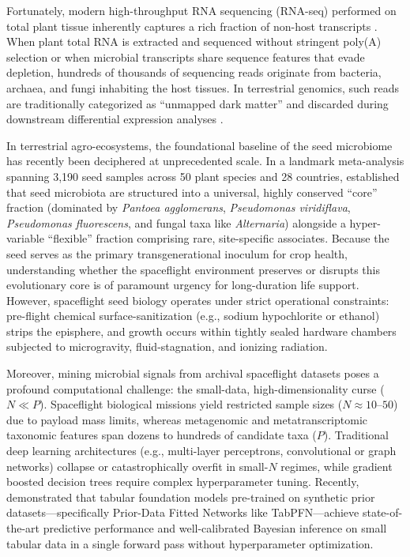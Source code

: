 Fortunately, modern high-throughput RNA sequencing (RNA-seq) performed on total plant tissue inherently captures a rich fraction of non-host transcripts \citep{park2019systematic}. When plant total RNA is extracted and sequenced without stringent poly(A) selection or when microbial transcripts share sequence features that evade depletion, hundreds of thousands of sequencing reads originate from bacteria, archaea, and fungi inhabiting the host tissues. In terrestrial genomics, such reads are traditionally categorized as ``unmapped dark matter'' and discarded during downstream differential expression analyses \citep{park2019systematic,ewels2020nf}.

In terrestrial agro-ecosystems, the foundational baseline of the seed microbiome has recently been deciphered at unprecedented scale. In a landmark meta-analysis spanning 3,190 seed samples across 50 plant species and 28 countries, \citet{simonin2022seed} established that seed microbiota are structured into a universal, highly conserved ``core'' fraction (dominated by \textit{Pantoea agglomerans}, \textit{Pseudomonas viridiflava}, \textit{Pseudomonas fluorescens}, and fungal taxa like \textit{Alternaria}) alongside a hyper-variable ``flexible'' fraction comprising rare, site-specific associates. Because the seed serves as the primary transgenerational inoculum for crop health, understanding whether the spaceflight environment preserves or disrupts this evolutionary core is of paramount urgency for long-duration life support. However, spaceflight seed biology operates under strict operational constraints: pre-flight chemical surface-sanitization (e.g., sodium hypochlorite or ethanol) strips the episphere, and growth occurs within tightly sealed hardware chambers subjected to microgravity, fluid-stagnation, and ionizing radiation.

Moreover, mining microbial signals from archival spaceflight datasets poses a profound computational challenge: the small-data, high-dimensionality curse ($N \ll P$). Spaceflight biological missions yield restricted sample sizes ($N \approx 10$--$50$) due to payload mass limits, whereas metagenomic and metatranscriptomic taxonomic features span dozens to hundreds of candidate taxa ($P$). Traditional deep learning architectures (e.g., multi-layer perceptrons, convolutional or graph networks) collapse or catastrophically overfit in small-$N$ regimes, while gradient boosted decision trees require complex hyperparameter tuning. Recently, \citet{hollmann2025accurate} demonstrated that tabular foundation models pre-trained on synthetic prior datasets—specifically Prior-Data Fitted Networks like TabPFN—achieve state-of-the-art predictive performance and well-calibrated Bayesian inference on small tabular data in a single forward pass without hyperparameter optimization.

